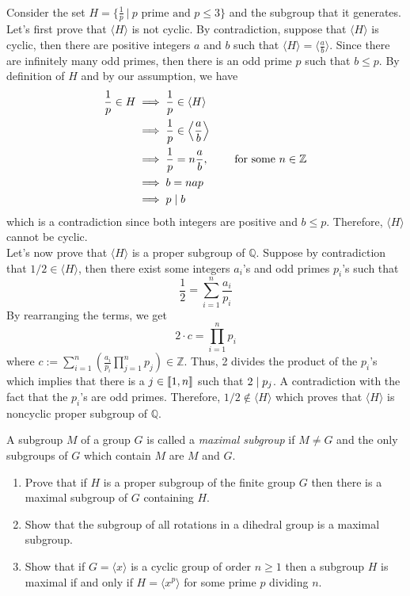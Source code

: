 \begin{solution}
    \\ Consider the set $H = \{\frac{1}{p} \ | \ p \text{ prime and } p\leq 3\}$ and the subgroup that it generates. Let's first prove that $\langle H \rangle$ is not cyclic. By contradiction, suppose that $\langle H \rangle$ is cyclic, then there are positive integers $a$ and $b$ such that $\langle H \rangle = \langle \frac{a}{b} \rangle$. Since there are infinitely many odd primes, then there is an odd prime $p$ such that $b \leq p$. By definition of $H$ and by our assumption, we have 
    \begin{align*}
        \frac{1}{p} \in H &\implies \frac{1}{p} \in \langle H \rangle \\
        &\implies \frac{1}{p} \in \left< \frac{a}{b} \right> \\
        &\implies \frac{1}{p} = n\frac{a}{b}, \qquad \text{ for some } n\in \mathbb{Z} \\
        &\implies b = nap \\
        &\implies p \mathrel{|} b
    \end{align*}
    which is a contradiction since both integers are positive and $b \leq p$. Therefore, $\langle H \rangle$ cannot be cyclic. \\
    Let's now prove that $\langle H \rangle$ is a proper subgroup of $\mathbb{Q}$. Suppose by contradiction that $1/2 \in \langle H \rangle$, then there exist some integers $a_i$'s and odd primes $p_i$'s such that 
    $$\frac{1}{2} = \sum_{i=1}^{n}\frac{a_i}{p_i}$$
    By rearranging the terms, we get 
    $$2 \cdot c = \prod_{i=1}^{n}p_i$$ 
    where  $c := \sum_{i=1}^{n}(\frac{a_i}{p_i}\prod_{j=1}^{n}p_j) \in \mathbb{Z}$. Thus, 2 divides the product of the $p_i$'s which implies that there is a $j \in \llbracket 1 , n \rrbracket$ such that $2 \mathrel{|} p_j$. A contradiction with the fact that the $p_i$'s are odd primes. Therefore, $1/2 \notin \langle H \rangle$ which proves that $\langle H \rangle$ is noncyclic proper subgroup of $\mathbb{Q}$.\\
\end{solution}

\begin{exercise}
    A subgroup $M$ of a group $G$ is called a \textit{maximal subgroup} if $M \neq G$ and the only subgroups of $G$ which contain $M$ are $M$ and $G$.
    \begin{enumerate}[label = \textbf{(\alph*)}]
        \item Prove that if $H$ is a proper subgroup of the finite group $G$ then there is a maximal subgroup of $G$ containing $H$.
        \item Show that the subgroup of all rotations in a dihedral group is a maximal subgroup.
        \item Show that if $G = \langle x \rangle$ is a cyclic group of order $n \geq 1$ then a subgroup $H$ is maximal if and only if $H = \langle x^p \rangle$ for some prime $p$ dividing $n$.
    \end{enumerate}
\end{exercise}

